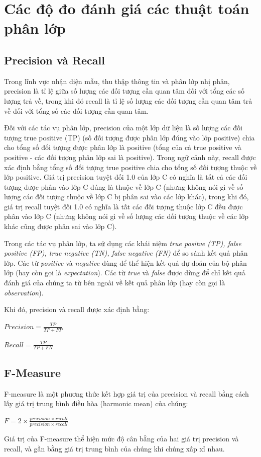 \section{Các độ đo đánh giá các thuật toán phân lớp}
\label{sec:eval}
\subsection{Precision và Recall}
Trong lĩnh vực nhận diện mẫu, thu thập thông tin và phân lớp nhị phân, precision là tỉ lệ giữa số lượng các đối tượng cần quan tâm đối với tổng các số lượng trả về, trong khi đó recall là tỉ lệ số lượng các đối tượng cần quan tâm trả về đối với tổng số các đối tượng cần quan tâm.

Đối với các tác vụ phân lớp, precision của một lớp dữ liệu là số lượng các đối tượng true positive (TP) (số đối tượng được phân lớp đúng vào lớp positive) chia cho tổng số đối tượng được phân lớp là positive (tổng của cả true positive và positive - các đối tượng phân lớp sai là positive). Trong ngữ cảnh này, recall được xác định bằng tổng số đối tượng true positive chia cho tổng số đối tượng thuộc về lớp positive. Giá trị precision tuyệt đối 1.0 của lớp C có nghĩa là tất cả các đối tượng được phân vào lớp C đúng là thuộc về lớp C (nhưng không nói gì về số lượng các đối tượng thuộc về lớp C bị phân sai vào các lớp khác), trong khi đó, giá trị recall tuyệt đối 1.0 có nghĩa là tất các đối tượng thuộc lớp C đều được phân vào lớp C (nhưng không nói gì về số lượng các dối tượng thuộc về các lớp khác cũng được phân sai vào lớp C).

Trong các tác vụ phân lớp, ta sử dụng các khái niệm \textit{true positve (TP), false positive (FP), true negative (TN), false negative (FN)} để so sánh kết quả phân lớp. Các từ \textit{positive} và \textit{negative} dùng để thể hiện kết quả dự đoán của bộ phân lớp (hay còn gọi là \textit{expectation}). Các từ \textit{true} và \textit{false} được dùng để chỉ kết quả đánh giá của chúng ta từ bên ngoài về kết quả phân lớp (hay còn gọi là  \textit{observation}).

Khi đó, precision và recall được xác định bằng:
\begin{center}
  $Precision = \frac{TP}{TP + FP}$
\end{center}
\begin{center}
  $Recall  = \frac{TP}{TP + FN}$
\end{center}
\subsection{F-Measure}
F-measure là một phương thức kết hợp giá trị của precision và recall bằng cách lấy giá trị trung bình điều hòa (harmonic mean) của chúng:
\begin{center}
  $F = 2\times \frac{precision\times recall}{precision\times recall}$
\end{center}
Giá trị của F-measure thể hiện mức độ cân bằng của hai giá trị precision và recall, và gần bằng giá trị trung bình của chúng khi chúng xấp xỉ nhau.
